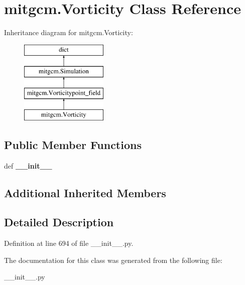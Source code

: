 \hypertarget{classmitgcm_1_1Vorticity}{\section{mitgcm.\+Vorticity Class Reference}
\label{classmitgcm_1_1Vorticity}
}
Inheritance diagram for mitgcm.\+Vorticity\+:\begin{figure}[H]
\begin{center}
\leavevmode
\includegraphics[height=4.000000cm]{classmitgcm_1_1Vorticity}
\end{center}
\end{figure}
\subsection*{Public Member Functions}
\begin{DoxyCompactItemize}
\item 
\hypertarget{classmitgcm_1_1Vorticity_a6fdcf74ea42dc79b3b8eab1eb2a149e4}{def {\bfseries \+\_\+\+\_\+init\+\_\+\+\_\+}}\label{classmitgcm_1_1Vorticity_a6fdcf74ea42dc79b3b8eab1eb2a149e4}

\end{DoxyCompactItemize}
\subsection*{Additional Inherited Members}


\subsection{Detailed Description}


Definition at line 694 of file \+\_\+\+\_\+init\+\_\+\+\_\+.\+py.



The documentation for this class was generated from the following file\+:\begin{DoxyCompactItemize}
\item 
\+\_\+\+\_\+init\+\_\+\+\_\+.\+py\end{DoxyCompactItemize}
